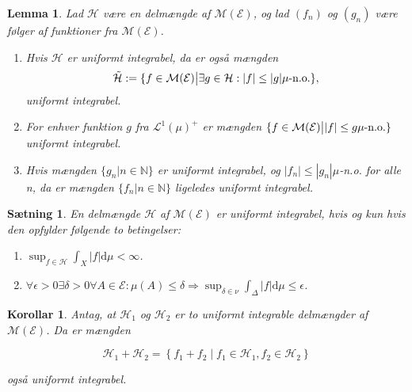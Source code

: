 \documentclass{article}
\newcommand{\N}{\mathbb{N}}
\newcommand{\1}{\mathbbm{1}}
\newcommand{\lclass}{\mathcal{L}}
\newtheorem{lemma}[theorem]{Lemma}
\newtheorem{corollary}[theorem]{Korollar}
\newtheorem{proposition}[theorem]{Sætning}
\theoremstyle{boxed}
\begin{document}
\begin{theorem-box}
    \begin{lemma}
        Lad $\mathcal{H}$ være en delmængde af $\mathcal{M}(\mathcal{E})$, og lad $(f_n)$ og $(g_n)$ være følger af funktioner fra $\mathcal{M}(\mathcal{E})$.
        \begin{enumerate}
            \item[\textnormal{(i)}] Hvis $\mathcal{H}$ er uniformt integrabel, da er også mængden 
            $$\tilde{\mathcal{H}}:=\{f\in\mathcal{M}(\mathcal{E})\big{|}\exists g\in\mathcal{H}:|f|\leq |g| \mu\text{-n.o.}\},$$
            uniformt integrabel.
            \item[\textnormal{(ii)}] For enhver funktion $g$ fra $\lclass^1(\mu)^+$ er mængden $\{f\in\mathcal{M}(\mathcal{E})\big{|}|f|\leq g \mu\text{-n.o.}\}$ uniformt integrabel.
            \item[\textnormal{(iii)}] Hvis mængden $\{g_n|n\in\N\}$ er uniformt integrabel, og $|f_n|\leq|g_n| \mu$-n.o. for alle n, da er mængden $\{f_n|n\in\N\}$ ligeledes uniformt integrabel.
        \end{enumerate}
    \end{lemma}
\end{theorem-box}
\begin{theorem-box}
    \begin{proposition}
        En delmængde $\mathcal{H}$ af $\mathcal{M}(\mathcal{E})$ er uniformt integrabel, hvis og kun hvis den opfylder følgende to betingelser:
        \begin{enumerate}
            \item[\textnormal{(i)}]$\sup _{f \in \mathcal{H}} \int_X|f| \mathrm{d} \mu<\infty$.
            \item[\textnormal{(ii)}] $\forall \epsilon>0 \exists \delta>0 \forall A \in \mathcal{E}: \mu(A) \leq \delta \Longrightarrow \sup _{\delta \in \nu} \int_{\Delta}|f| \mathrm{d} \mu \leq \epsilon$.
        \end{enumerate}
    \end{proposition}
\end{theorem-box}
\begin{theorem-box}
    \begin{corollary}
        Antag, at $\mathcal{H}_1$ og $\mathcal{H}_2$ er to uniformt integrable delmængder af $\mathcal{M}(\mathcal{E})$.
Da er mængden

$$
\mathcal{H}_1+\mathcal{H}_2=\left\{f_1+f_2 \mid f_1 \in \mathcal{H}_1, f_2 \in \mathcal{H}_2\right\}
$$

også uniformt integrabel.
    \end{corollary}
\end{theorem-box}
\end{document}
